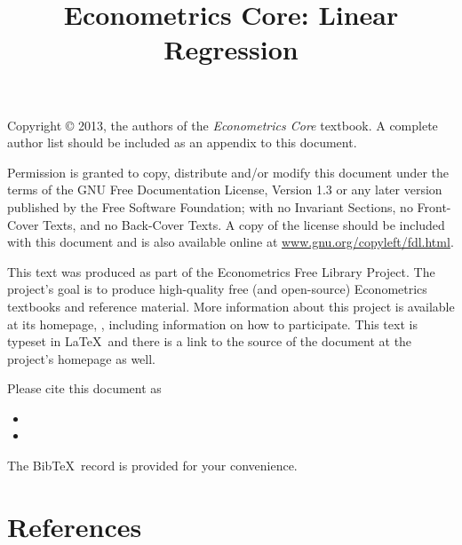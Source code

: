 \documentclass{tex/tufte-handout}
\title{Econometrics Core: Linear Regression}
\begin{document}
\maketitle

\bigskip\noindent%
Copyright © 2013, the authors of the \textit{Econometrics Core}
textbook.  A complete author list should be included as an appendix to
this document.

Permission is granted to copy, distribute and/or modify this document
under the terms of the GNU Free Documentation License, Version 1.3 or
any later version published by the Free Software Foundation; with no
Invariant Sections, no Front-Cover Texts, and no Back-Cover Texts.  A
copy of the license should be included with this document and is also
available online at \url{www.gnu.org/copyleft/fdl.html}.

This text was produced as part of the Econometrics Free Library
Project.  The project's goal is to produce high-quality free (and
open-source) Econometrics textbooks and reference material.  More
information about this project is available at its homepage,
\homepage, including information on how
to participate.  This text is typeset in \LaTeX\ and there is a link
to the source of the document at the project's homepage as well.

Please cite this document as
\begin{itemize}
\item[] 
\item[] 
\end{itemize}
The Bib\!\TeX\ record is provided for your convenience.

\tableofcontents









\part*{References}%

\end{document}
